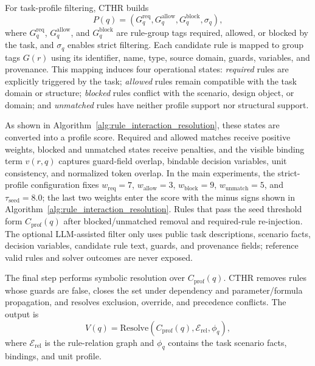 ﻿\documentclass[a4paper,fleqn]{cas-dc}
\begin{document}
For task-profile filtering, CTHR builds
\begin{equation}
P(q)=\left(G_q^{\mathrm{req}},G_q^{\mathrm{allow}},G_q^{\mathrm{block}},\sigma_q\right),
\end{equation}
where $G_q^{\mathrm{req}}$, $G_q^{\mathrm{allow}}$, and $G_q^{\mathrm{block}}$ are rule-group tags required, allowed, or blocked by the task, and $\sigma_q$ enables strict filtering. Each candidate rule is mapped to group tags $G(r)$ using its identifier, name, type, source domain, guards, variables, and provenance. This mapping induces four operational states: \emph{required} rules are explicitly triggered by the task; \emph{allowed} rules remain compatible with the task domain or structure; \emph{blocked} rules conflict with the scenario, design object, or domain; and \emph{unmatched} rules have neither profile support nor structural support.

As shown in Algorithm~\ref{alg:rule_interaction_resolution}, these states are converted into a profile score. Required and allowed matches receive positive weights, blocked and unmatched states receive penalties, and the visible binding term $v(r,q)$ captures guard-field overlap, bindable decision variables, unit consistency, and normalized token overlap. In the main experiments, the strict-profile configuration fixes $w_{\mathrm{req}}=7$, $w_{\mathrm{allow}}=3$, $w_{\mathrm{block}}=9$, $w_{\mathrm{unmatch}}=5$, and $\tau_{\mathrm{seed}}=8.0$; the last two weights enter the score with the minus signs shown in Algorithm~\ref{alg:rule_interaction_resolution}. Rules that pass the seed threshold form $C_{\mathrm{prof}}(q)$ after blocked/unmatched removal and required-rule re-injection. The optional LLM-assisted filter only uses public task descriptions, scenario facts, decision variables, candidate rule text, guards, and provenance fields; reference valid rules and solver outcomes are never exposed.

The final step performs symbolic resolution over $C_{\mathrm{prof}}(q)$. CTHR removes rules whose guards are false, closes the set under dependency and parameter/formula propagation, and resolves exclusion, override, and precedence conflicts. The output is
\begin{equation}
V(q)=\mathrm{Resolve}\left(C_{\mathrm{prof}}(q),\mathcal{E}_{\mathrm{rel}},\phi_q\right),
\end{equation}
where $\mathcal{E}_{\mathrm{rel}}$ is the rule-relation graph and $\phi_q$ contains the task scenario facts, bindings, and unit profile.
\end{document}
